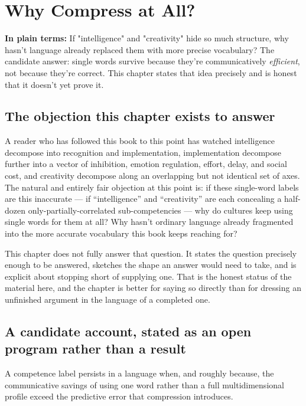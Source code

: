 \chapter{Why Compress at All?}
\label{ch:why-compress}

\begin{plainlanguage}
\textbf{In plain terms:} If "intelligence" and "creativity" hide so much structure, why hasn't language already replaced them with more precise vocabulary? The candidate answer: single words survive because they're communicatively \emph{efficient}, not because they're correct. This chapter states that idea precisely and is honest that it doesn't yet prove it.
\end{plainlanguage}

\section{The objection this chapter exists to answer}

A reader who has followed this book to this point has watched intelligence decompose into recognition and implementation, implementation decompose further into a vector of inhibition, emotion regulation, effort, delay, and social cost, and creativity decompose along an overlapping but not identical set of axes. The natural and entirely fair objection at this point is: if these single-word labels are this inaccurate --- if ``intelligence'' and ``creativity'' are each concealing a half-dozen only-partially-correlated sub-competencies --- why do cultures keep using single words for them at all? Why hasn't ordinary language already fragmented into the more accurate vocabulary this book keeps reaching for?

This chapter does not fully answer that question. It states the question precisely enough to be answered, sketches the shape an answer would need to take, and is explicit about stopping short of supplying one. That is the honest status of the material here, and the chapter is better for saying so directly than for dressing an unfinished argument in the language of a completed one.

\section{A candidate account, stated as an open program rather than a result}

\begin{conjecture}
A competence label persists in a language when, and roughly because, the communicative savings of using one word rather than a full multidimensional profile exceed the predictive error that compression introduces.
\end{conjecture}

